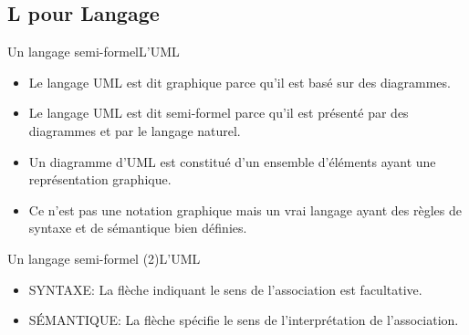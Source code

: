 \documentclass{beamer}
\begin{document}
  \subsection{L pour Langage}
    \begin{frame}{Un langage semi-formel}{L'UML}
      \begin{itemize}
       \item{Le langage UML est dit graphique parce qu'il est basé sur des diagrammes.\pause}
       \item<2->{Le langage UML est dit semi-formel parce qu'il est présenté par des diagrammes et par le langage naturel.}
       \item<3->{Un diagramme d'UML est constitué d'un ensemble d'éléments ayant une représentation graphique.}
       \item<4->{Ce n'est pas une notation graphique mais un vrai langage ayant des règles de syntaxe et de sémantique bien définies.}
      \end{itemize}
    \end{frame}

    \begin{frame}{Un langage semi-formel (2)}{L'UML}
      \begin{itemize}
        \begin{Example}
        \end{Example}
        \item{SYNTAXE: La flèche indiquant le sens de l'association est facultative.}
        \item{SÉMANTIQUE: La flèche spécifie le sens de l'interprétation de l'association.}
      \end{itemize}
    \end{frame}

\end{document}
